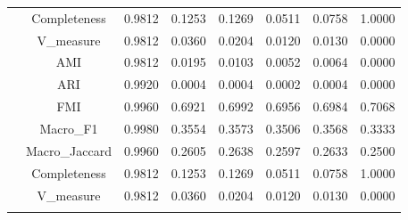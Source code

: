 \begin{table}[ht!]
\begin{tabular*}{\linewidth}{@{} lc c c c c c c @{}}
 & Completeness  & 0.9812 & 0.1253 & 0.1269 & 0.0511 & 0.0758 & 1.0000 \\

 & V_measure  & 0.9812 & 0.0360 & 0.0204 & 0.0120 & 0.0130 & 0.0000 \\
\addlinespace
\multirow{7}{*}{IZGC}
 & AMI  & 0.9812 & 0.0195 & 0.0103 & 0.0052 & 0.0064 & 0.0000 \\

 & ARI  & 0.9920 & 0.0004 & 0.0004 & 0.0002 & 0.0004 & 0.0000 \\

 & FMI  & 0.9960 & 0.6921 & 0.6992 & 0.6956 & 0.6984 & 0.7068 \\

 & Macro_F1  & 0.9980 & 0.3554 & 0.3573 & 0.3506 & 0.3568 & 0.3333 \\

 & Macro_Jaccard  & 0.9960 & 0.2605 & 0.2638 & 0.2597 & 0.2633 & 0.2500 \\

 & Completeness  & 0.9812 & 0.1253 & 0.1269 & 0.0511 & 0.0758 & 1.0000 \\

 & V_measure  & 0.9812 & 0.0360 & 0.0204 & 0.0120 & 0.0130 & 0.0000 \\
\addlinespace
\bottomrule
\end{tabular*}
\end{table}